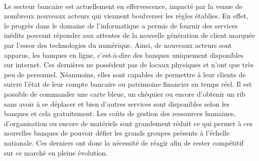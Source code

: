 
\paragraph{}
Le secteur bancaire est actuellement en effervescence, impacté par la venue de nombreux nouveaux acteurs qui viennent boulverser les règles établies. En effet, le progrès dans le domaine de l'informatique a permis de fournir des services inédits pouvant répondre aux attentes de la nouvelle génération de client marquée par l'essor des technologies du numérique. Ainsi, de nouveaux acteurs sont apparus, les banques en ligne, c'est-à-dire des banques uniquement disponibles sur internet. Ces dernières ne possèdent pas de locaux physiques et n'ont que très peu de personnel. Néanmoins, elles sont capables de permettre à leur clients de suivre l'état de leur compte bancaire ou patrimoine financier en temps réel. Il est possible de commander une carte bleue, un chéquier ou encore d'obtenir un rib sans avoir à se déplacer et bien d'autres services sont disponibles selon les banques et cela gratuitement. Les coûts de gestion des ressources humaines, d'organisation ou encore de matériels sont grandement réduit ce qui permet à ces nouvelles banques de pouvoir défier les grands groupes présents à l'échelle nationale. Ces derniers ont donc la nécessité de réagir afin de rester compétitif sur ce marché en pleine évolution.

